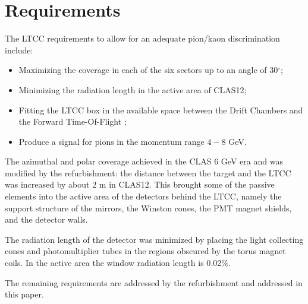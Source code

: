 \section{Requirements}


The LTCC requirements to allow for an adequate pion/kaon discrimination include:


\begin{itemize}
	\item Maximizing the coverage in each of the six sectors up to an angle of 30$^{\circ}$;
	\item Minimizing the radiation length in the active area of CLAS12;
	\item Fitting the LTCC box in the available space between the Drift Chambers \cite{dc2019} and the Forward Time-Of-Flight \cite{ftof2019};
	\item Produce a signal for pions in the momentum range $4-8$ GeV.
\end{itemize}

The azimuthal and polar coverage achieved in the CLAS 6 GeV era and was modified by the refurbishment:
the distance between the target and the LTCC was increased by about 2 m in CLAS12. This brought some of the passive
elements into the active area of the detectors behind the LTCC, namely the support structure of the mirrors, the Winston
cones, the PMT magnet shields, and the detector walls.

The radiation length of the detector was minimized by placing the light collecting cones and photomultiplier tubes
in the regions obscured by the torus magnet coils. In the active area the window radiation length is 0.02$\%$.

The remaining requirements are addressed by the refurbishment and addressed in this paper.
